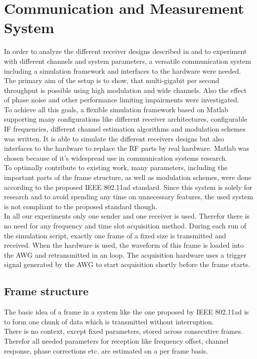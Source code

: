 \chapter{Communication and Measurement System}
\label{chap:sys}

In order to analyze the different receiver designs described in
 and to experiment with different channels
and system parameters, a versatile communication system
including a simulation framework and interfaces to the hardware
were needed. \\

The primary aim of the setup is to show, that multi-gigabit per second
throughput is possible using high modulation and wide channels.
Also the effect of phase noise and other performance limiting impairments
were investigated. \\

To achieve all this goals, a flexible simulation framework based on Matlab
supporting many configurations like different receiver architectures,
configurable \gls{IF} frequencies, different channel estimation algorithms
and modulation schemes was written. It is able to simulate
the different receivers designs but also interfaces to the hardware
to replace the \gls{RF} parts by real hardware. Matlab was chosen
because of it's widespread use in communication systems research. \\

To optimally contribute to existing work, many parameters, including
the important parts of the frame structure, as well as modulation
schemes, were done according to the proposed \gls{IEEE} 802.11ad standard.
Since this system is solely for research and to avoid spending any
time on unnecessary features, the used system is not compliant to the
proposed standard though. \\

In all our experiments only one sender and one receiver is used.
Therefor there is no need for any frequency and time slot acquisition
method. During each run of the simulation script, exactly one frame
of a fixed size is transmitted and received.
When the hardware is used, the waveform of this frame is loaded into
the \gls{AWG} and retransmitted in an loop.
The acquisition hardware uses a trigger signal generated by the \gls{AWG}
to start acquisition shortly before the frame starts.

\section{Frame structure}
\label{sec:sys_frame_struct}
The basic idea of a frame in a system like the one proposed by
IEEE 802.11ad is to form one chunk of data which is transmitted without
interruption. \\
There is no context, except fixed parameters, stored across consecutive
frames. Therefor all needed parameters for reception like frequency offset,
channel response, phase corrections etc. are estimated on a per frame basis. \\

